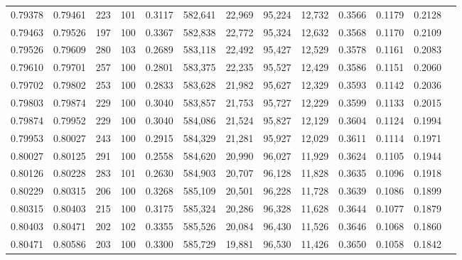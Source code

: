 \begin{tabular}{rrrrrrrrrrrrr}
0.79378 & 0.79461 &   223 & 101 &                                     0.3117 & 582,641 &  22,969 &  95,224 &  12,732 & 0.3566 & 0.1179 & 0.2128 \\
0.79463 & 0.79526 &   197 & 100 &                                     0.3367 & 582,838 &  22,772 &  95,324 &  12,632 & 0.3568 & 0.1170 & 0.2109 \\
0.79526 & 0.79609 &   280 & 103 &                                     0.2689 & 583,118 &  22,492 &  95,427 &  12,529 & 0.3578 & 0.1161 & 0.2083 \\
0.79610 & 0.79701 &   257 & 100 &                                     0.2801 & 583,375 &  22,235 &  95,527 &  12,429 & 0.3586 & 0.1151 & 0.2060 \\
0.79702 & 0.79802 &   253 & 100 &                                     0.2833 & 583,628 &  21,982 &  95,627 &  12,329 & 0.3593 & 0.1142 & 0.2036 \\
0.79803 & 0.79874 &   229 & 100 &                                     0.3040 & 583,857 &  21,753 &  95,727 &  12,229 & 0.3599 & 0.1133 & 0.2015 \\
0.79874 & 0.79952 &   229 & 100 &                                     0.3040 & 584,086 &  21,524 &  95,827 &  12,129 & 0.3604 & 0.1124 & 0.1994 \\
0.79953 & 0.80027 &   243 & 100 &                                     0.2915 & 584,329 &  21,281 &  95,927 &  12,029 & 0.3611 & 0.1114 & 0.1971 \\
0.80027 & 0.80125 &   291 & 100 &                                     0.2558 & 584,620 &  20,990 &  96,027 &  11,929 & 0.3624 & 0.1105 & 0.1944 \\
0.80126 & 0.80228 &   283 & 101 &                                     0.2630 & 584,903 &  20,707 &  96,128 &  11,828 & 0.3635 & 0.1096 & 0.1918 \\
0.80229 & 0.80315 &   206 & 100 &                                     0.3268 & 585,109 &  20,501 &  96,228 &  11,728 & 0.3639 & 0.1086 & 0.1899 \\
0.80315 & 0.80403 &   215 & 100 &                                     0.3175 & 585,324 &  20,286 &  96,328 &  11,628 & 0.3644 & 0.1077 & 0.1879 \\
0.80403 & 0.80471 &   202 & 102 &                                     0.3355 & 585,526 &  20,084 &  96,430 &  11,526 & 0.3646 & 0.1068 & 0.1860 \\
0.80471 & 0.80586 &   203 & 100 &                                     0.3300 & 585,729 &  19,881 &  96,530 &  11,426 & 0.3650 & 0.1058 & 0.1842 \\

\end{tabular}

